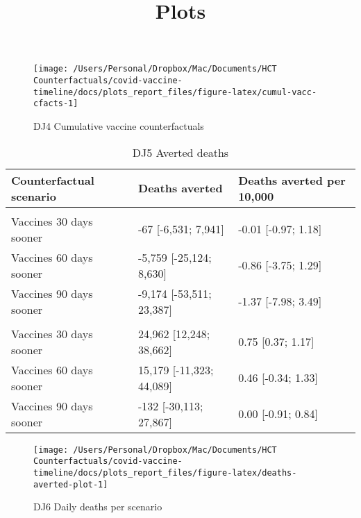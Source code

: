 \documentclass[
  12pt,
]{article}
\title{Plots}
\author{}
\date{\vspace{-2.5em}}
\begin{document}
\maketitle

\begin{figure}

{\centering \texttt{[image: /Users/Personal/Dropbox/Mac/Documents/HCT Counterfactuals/covid-vaccine-timeline/docs/plots\_report\_files/figure-latex/cumul-vacc-cfacts-1]} 

}

\caption{DJ4 Cumulative vaccine counterfactuals}\label{fig:cumul-vacc-cfacts}
\end{figure}

\begin{table}

\caption{\label{tab:deaths-averted-table}DJ5 Averted deaths}
\centering
\begin{tabular}[t]{lll}
\toprule
Counterfactual scenario & Deaths averted & Deaths averted per 10,000\\
\midrule
\addlinespace[0.3em]
\multicolumn{3}{l}{\textbf{United Kingdom}}\\
\hspace{1em}Vaccines 30 days sooner & -67 [-6,531; 7,941] & -0.01 [-0.97; 1.18]\\
\hspace{1em}Vaccines 60 days sooner & -5,759 [-25,124; 8,630] & -0.86 [-3.75; 1.29]\\
\hspace{1em}Vaccines 90 days sooner & -9,174 [-53,511; 23,387] & -1.37 [-7.98; 3.49]\\
\addlinespace[0.3em]
\multicolumn{3}{l}{\textbf{United States}}\\
\hspace{1em}Vaccines 30 days sooner & 24,962 [12,248; 38,662] & 0.75 [0.37; 1.17]\\
\hspace{1em}Vaccines 60 days sooner & 15,179 [-11,323; 44,089] & 0.46 [-0.34; 1.33]\\
\hspace{1em}Vaccines 90 days sooner & -132 [-30,113; 27,867] & 0.00 [-0.91; 0.84]\\
\bottomrule
\end{tabular}
\end{table}

\begin{figure}

{\centering \texttt{[image: /Users/Personal/Dropbox/Mac/Documents/HCT Counterfactuals/covid-vaccine-timeline/docs/plots\_report\_files/figure-latex/deaths-averted-plot-1]} 

}

\caption{DJ6 Daily deaths per scenario}\label{fig:deaths-averted-plot}
\end{figure}
\end{document}
